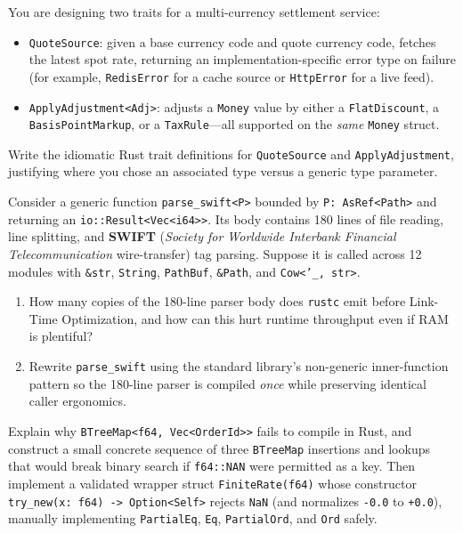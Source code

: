 \begin{exercise}
\label{ch06:ex-assoc-vs-generic}
You are designing two traits for a multi-currency settlement service:
\begin{itemize}
  \item \texttt{QuoteSource}: given a base currency code and quote currency code, fetches the latest spot rate, returning an implementation-specific error type on failure (for example, \texttt{RedisError} for a cache source or \texttt{HttpError} for a live feed).
  \item \texttt{ApplyAdjustment<Adj>}: adjusts a \texttt{Money} value by either a \texttt{FlatDiscount}, a \texttt{BasisPointMarkup}, or a \texttt{TaxRule}---all supported on the \emph{same} \texttt{Money} struct.
\end{itemize}
Write the idiomatic Rust trait definitions for \texttt{QuoteSource} and \texttt{ApplyAdjustment}, justifying where you chose an associated type versus a generic type parameter.
\end{exercise}

\begin{exercise}
\label{ch06:ex-debloat}
Consider a generic function \texttt{parse\_swift<P>} bounded by \texttt{P: AsRef<Path>} and returning an \texttt{io::Result<Vec<i64>>}. Its body contains 180 lines of file reading, line splitting, and \textbf{SWIFT} (\emph{Society for Worldwide Interbank Financial Telecommunication} wire-transfer) tag parsing. Suppose it is called across 12 modules with \texttt{\&str}, \texttt{String}, \texttt{PathBuf}, \texttt{\&Path}, and \texttt{Cow<'\_, str>}.
\begin{enumerate}
  \item How many copies of the 180-line parser body does \texttt{rustc} emit before Link-Time Optimization, and how can this hurt runtime throughput even if RAM is plentiful?
  \item Rewrite \texttt{parse\_swift} using the standard library's non-generic inner-function pattern so the 180-line parser is compiled \emph{once} while preserving identical caller ergonomics.
\end{enumerate}
\end{exercise}

\begin{exercise}
\label{ch06:ex-ord-wrapper}
Explain why \texttt{BTreeMap<f64, Vec<OrderId>>} fails to compile in Rust, and construct a small concrete sequence of three \texttt{BTreeMap} insertions and lookups that would break binary search if \texttt{f64::NAN} were permitted as a key. Then implement a validated wrapper struct \texttt{FiniteRate(f64)} whose constructor \texttt{try\_new(x: f64) -> Option<Self>} rejects \texttt{NaN} (and normalizes \texttt{-0.0} to \texttt{+0.0}), manually implementing \texttt{PartialEq}, \texttt{Eq}, \texttt{PartialOrd}, and \texttt{Ord} safely.
\end{exercise}
